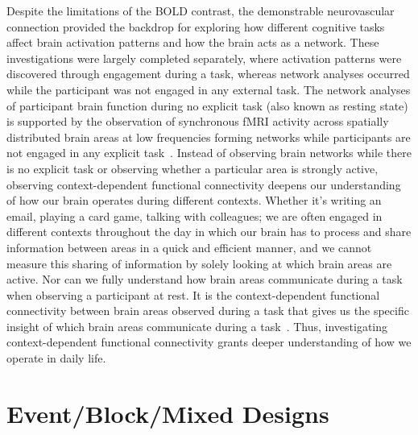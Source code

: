 \documentclass[phd,figures,tables,ackpage,abstractpage,publicabstractpage]{uithesis}
\begin{document}
Despite the limitations of the BOLD contrast, the demonstrable neurovascular 
connection provided the backdrop for exploring how different
cognitive tasks affect brain activation patterns and how the brain acts as a
network.
These investigations were largely completed separately, where activation patterns
were discovered through engagement during a task, whereas network analyses
occurred while the participant was not engaged in any external task.
The network analyses of participant brain function during no explicit task
(also known as resting state) is supported by the observation of synchronous fMRI activity
across spatially distributed brain areas at low frequencies forming networks while
participants are not engaged in any explicit task~\cite{Greicius2003,Raichle2009}.
Instead of observing brain networks while there is no explicit task or observing
whether a particular area is strongly active, observing context-dependent functional
connectivity deepens our understanding of how our brain operates during different contexts.
Whether it's writing an email, playing a card game, talking with colleagues; we are
often engaged in different contexts throughout the day in which our brain has to process
and share information between areas in a quick and efficient manner, and we cannot
measure this sharing of information by solely looking at which brain areas are active.
Nor can we fully understand how brain areas communicate during a task when observing a
participant at rest.
It is the context-dependent functional connectivity between brain areas observed during a task
that gives us the specific insight of which brain areas communicate during a task~\cite{Friston1997}.
Thus, investigating context-dependent functional connectivity grants deeper understanding
of how we operate in daily life.

\section{Event/Block/Mixed Designs}
\end{document}

